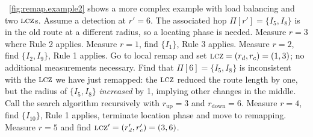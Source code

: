 \figstr~\ref{fig:remap.example2} shows a more complex example with
load balancing and two $\mathrm{\textsc{lcz}}$s.  Assume a detection at $r' = 6$. The
associated hop $\Pi[r'] = \{I_5, I_8\}$ is in the old route at a
different radius, so a locating phase is needed.  Measure $r = 3$ where
Rule 2 applies.  Measure $r = 1$, find $\{I_1\}$, Rule 3 applies.
Measure $r = 2$, find $\{I_2, I_9\}$, Rule 1 applies.  Go to local remap
and set $\mathrm{\textsc{lcz}} = (r_d, r_c)=(1,3)$; no additional measurements necessary.
Find that $\Pi[6] = \{I_5, I_8\}$ is inconsistent with the $\mathrm{\textsc{lcz}}$ we
have just remapped: the $\mathrm{\textsc{lcz}}$ reduced the route length by one, but the
radius of $\{I_5, I_8\}$ \emph{increased} by 1, implying other changes
in the middle.  Call the search algorithm recursively with
$r_\mathrm{up} = 3$ and $r_\mathrm{down} = 6$.  Measure $r = 4$, find
$\{I_{10}\}$,  Rule 1 applies, terminate location phase and move to
remapping.  Measure $r = 5$ and find $\mathrm{\textsc{lcz}}' = (r'_d, r'_c) = (3, 6)$.

